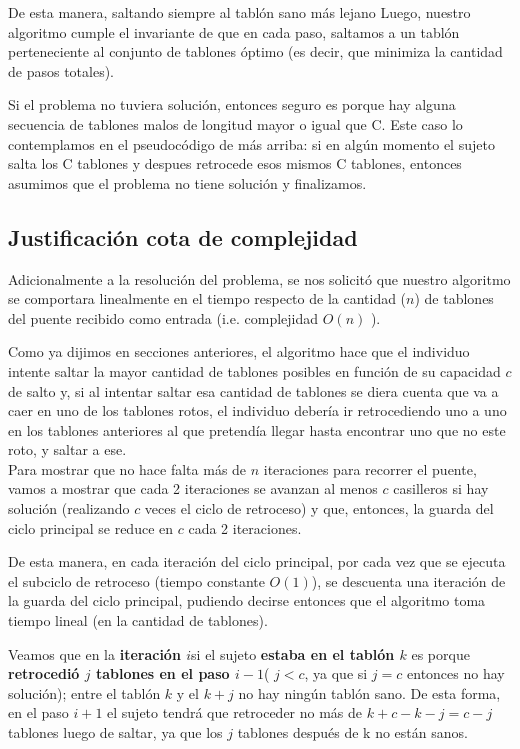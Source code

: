 De esta manera, saltando siempre al tablón sano más lejano Luego, nuestro algoritmo cumple el invariante de que en cada paso, saltamos a un tabl\'on perteneciente al conjunto de tablones \'optimo (es decir, que minimiza la cantidad de pasos totales). 

Si el problema no tuviera soluci\'on, entonces seguro es porque hay alguna secuencia de tablones malos de longitud mayor o igual que C. Este caso lo contemplamos en el pseudoc\'odigo de m\'as arriba: si en alg\'un momento el sujeto salta los C tablones y despues retrocede esos mismos C tablones, entonces asumimos que el problema no tiene soluci\'on y finalizamos.

\subsection{Justificaci\'on cota de complejidad}

Adicionalmente a la resolución del problema, se nos solicitó que nuestro algoritmo se comportara linealmente en el tiempo respecto de la cantidad ($n$) de tablones del puente recibido como entrada (i.e. complejidad  $O(n)$ ). 

Como ya dijimos en secciones anteriores, el algoritmo hace que el individuo intente saltar la mayor cantidad de tablones posibles en funci\'on de su capacidad $c$ de salto y, si al intentar saltar esa cantidad de tablones se diera cuenta que va a caer en uno de los tablones rotos, el individuo deber\'ia ir retrocediendo uno a uno en los tablones anteriores al que pretend\'ia llegar hasta encontrar uno que no este roto, y saltar a ese. \\

Para mostrar que no hace falta más de $n$ iteraciones para recorrer el puente, vamos a mostrar que cada 2 iteraciones se avanzan al menos $c$ casilleros si hay solución (realizando $c$ veces el ciclo de retroceso) y que, entonces, la guarda del ciclo principal se reduce en $c$ cada 2 iteraciones. 

De esta manera, en cada iteración del ciclo principal, por cada vez que se ejecuta el subciclo de retroceso (tiempo constante $O(1)$), se descuenta una iteración de la guarda del ciclo principal, pudiendo decirse entonces que el algoritmo toma tiempo lineal (en la cantidad de tablones). 

Veamos que en la \textbf{iteración $i$}si el sujeto \textbf{estaba en el tabl\'on $k$} es porque \textbf{retrocedió $j$ tablones en el paso $i-1$}( $j<c$, ya que si $j=c$ entonces no hay solución); entre el tabl\'on $k$ y el $k+j$ no hay ning\'un tabl\'on sano. De esta forma, en el paso $i+1$ el sujeto tendr\'a que retroceder no m\'as de $k+c-k-j = c-j$ tablones luego de saltar, ya que los $j$ tablones después de k no están sanos. 

